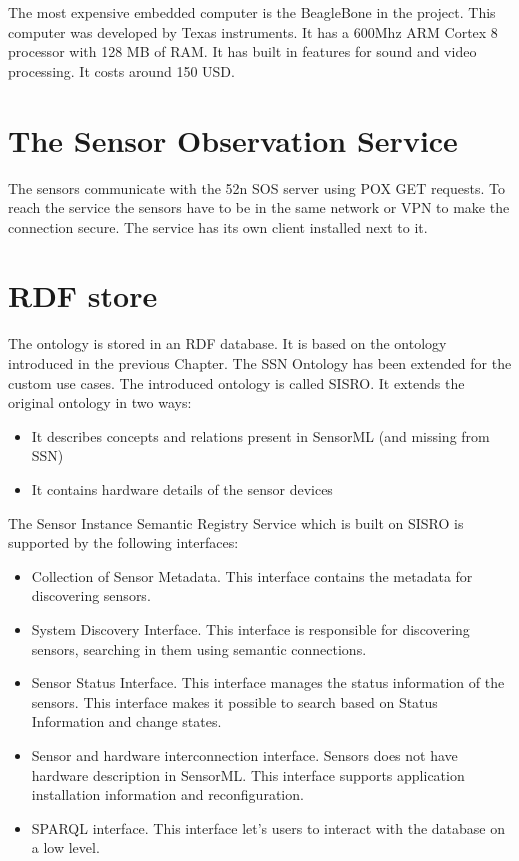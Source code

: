 The most expensive embedded computer is the BeagleBone in the project. This computer was developed by Texas instruments. It has a 600Mhz ARM Cortex 8 processor with 128 MB of RAM. It has built in features for sound and video processing. It costs around 150 USD. 

\section{The Sensor Observation Service}

The sensors communicate with the 52n SOS server using POX GET requests. To reach the service the sensors have to be in the same network or VPN to make the connection secure. The service has its own client installed next to it.

\section{RDF store}

The ontology is stored in an RDF database. It is based on the ontology introduced in the previous Chapter. The SSN Ontology has been extended for the custom use cases. The introduced ontology is called SISRO. It extends the original ontology in two ways:
\begin{itemize}
	\item It describes concepts and relations present in SensorML (and missing from SSN)
	\item It contains hardware details of the sensor devices
\end{itemize}
The Sensor Instance Semantic Registry Service which is built on SISRO is supported by the following interfaces:
\begin{itemize}
	\item Collection of Sensor Metadata. This interface contains the metadata for discovering sensors.
	\item System Discovery Interface. This interface is responsible for discovering sensors, searching in them using semantic connections.
	\item Sensor Status Interface. This interface manages the status information of the sensors. This interface makes it possible to search based on Status Information and change states.
	\item Sensor and hardware interconnection interface. Sensors does not have hardware description in SensorML. This interface supports application installation information and reconfiguration.
	\item SPARQL interface. This interface let's users to interact with the database on a low level.
	  
\end{itemize}
